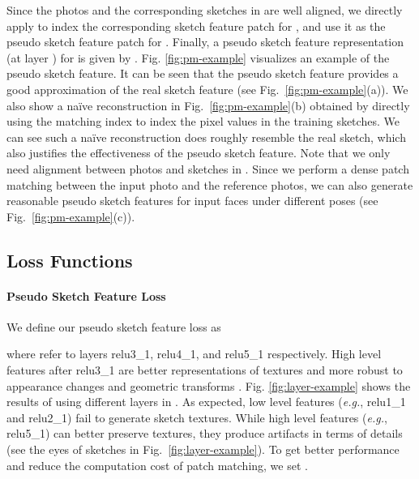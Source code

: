 \documentclass[runningheads]{llncs}
\def\eg{{\em e.g.}}
\begin{document}
Since the photos and the corresponding sketches in  are well aligned, we directly apply  to index the corresponding sketch feature patch  for , and use it as the pseudo sketch feature patch  for . Finally, a pseudo sketch feature representation (at layer ) for   is given by . Fig. \ref{fig:pm-example} visualizes an example of the pseudo sketch feature. It can be seen that the pseudo sketch feature provides a good approximation of the real sketch feature (see Fig.~\ref{fig:pm-example}(a)). We also show a na\"{i}ve reconstruction  in Fig.~\ref{fig:pm-example}(b) obtained by directly using the matching index to index the pixel values in the training sketches. We can see such a na\"{i}ve reconstruction does roughly resemble the real sketch, which also justifies the effectiveness of the pseudo sketch feature. Note that we only need alignment between photos and sketches in . Since we perform a dense patch matching between the input photo and the reference photos, we can also generate reasonable pseudo sketch features for input faces under different poses (see Fig.~\ref{fig:pm-example}(c)).

\begin{figure*}
  \centering
    \caption{(a) Ground truth sketch feature (middle) and pseudo sketch feature of the relu3\_1 layer (right). (b) Ground truth sketch (left) and pixel level projection of the patch matching result (right). (c) Photos in the wild without ground truth sketches. (\textit{Note that the pixel level results are only for visualization, and they are not used in training.})}
    \label{fig:pm-example}
\end{figure*}

\subsection{Loss Functions}

\paragraph{Pseudo Sketch Feature Loss}
We define our pseudo sketch feature loss as

where  refer to layers relu3\_1, relu4\_1, and relu5\_1 respectively. High level features after relu3\_1 are better representations of textures and more robust to appearance changes and geometric transforms \cite{li2016combining}. Fig. \ref{fig:layer-example} shows the results of using different layers in . As expected, low level features (\eg, relu1\_1 and relu2\_1) fail to generate sketch textures. While high level features (\eg, relu5\_1) can better preserve textures, they produce artifacts in terms of details (see the eyes of sketches in Fig.~\ref{fig:layer-example}). To get better performance and reduce the computation cost of patch matching, we set .
\end{document}
